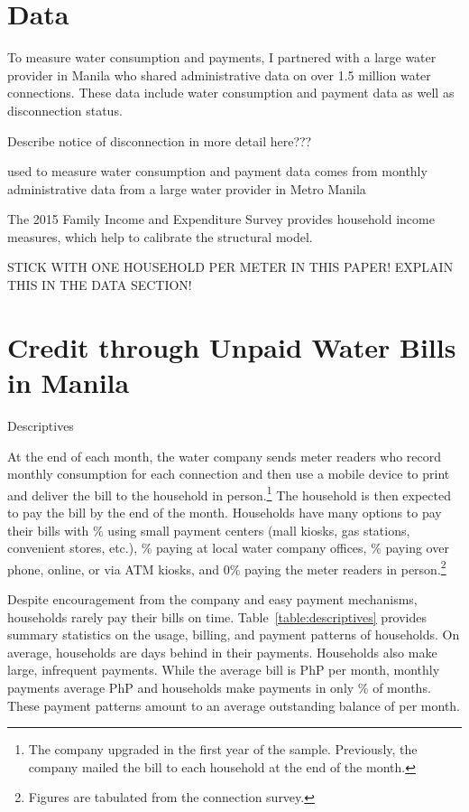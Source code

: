 \documentclass[12pt]{article}
\begin{document}
\section{Data}

To measure water consumption and payments, I partnered with a large water provider in Manila who shared administrative data on over 1.5 million water connections.  These data include water consumption and payment data as well as disconnection status. 

Describe notice of disconnection in more detail here???

used to measure water consumption and payment data comes from monthly administrative data from a large water provider in Metro Manila


The 2015 Family Income and Expenditure Survey provides household income measures, which help to calibrate the structural model.  

STICK WITH ONE HOUSEHOLD PER METER IN THIS PAPER!  EXPLAIN THIS IN THE DATA SECTION!

\section{Credit through Unpaid Water Bills in Manila}

\begin{table}
\centering
\caption{Descriptives}\label{table:descriptives}

\end{table}

At the end of each month, the water company sends meter readers who record monthly consumption for each connection and then use a mobile device to print and deliver the bill to the household in person.\footnote{The company upgraded in the first year of the sample.  Previously, the company mailed the bill to each household at the end of the month.}  The household is then expected to pay the bill by the end of the month.  Households have many options to pay their bills with \unskip\% using small payment centers (mall kiosks, gas stations, convenient stores, etc.), \unskip\% paying at local water company offices, \unskip\% paying over phone, online, or via ATM kiosks, and 0\unskip\unskip\% paying the meter readers in person.\footnote{Figures are tabulated from the connection survey.}  

Despite encouragement from the company and easy payment mechanisms, households rarely pay their bills on time.  Table~\ref{table:descriptives} provides summary statistics on the usage, billing, and payment patterns of households.  On average, households are days behind in their payments.  Households also make large, infrequent payments.  While the average bill is PhP per month, monthly payments average PhP and households make payments in only \unskip\% of months.  These payment patterns amount to an average outstanding balance of  per month.  
\end{document}
